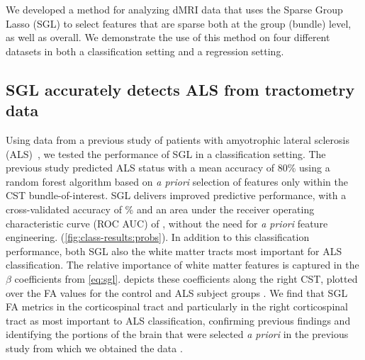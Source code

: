\documentclass[10pt,letterpaper]{article}
\begin{document}
We developed a method for analyzing dMRI  data that uses the Sparse
Group Lasso (SGL) to select features that are sparse both at the group (bundle) level, as well as overall.
We demonstrate the use of this method on four different datasets in
both a classification setting and a regression setting.

\subsection*{SGL accurately detects ALS from tractometry data}

Using data from a previous study of patients with amyotrophic lateral sclerosis (ALS)~\cite{sarica2017corticospinal}, we tested the performance of SGL in a
classification setting. The previous study predicted ALS status with a mean
accuracy of 80\% using a random forest algorithm based on \emph{a priori}
selection of features only within the CST bundle-of-interest.
SGL delivers improved predictive performance, with a cross-validated accuracy
of {\alsAccuracy}\% and an area under the receiver operating characteristic
curve (ROC AUC) of {\alsRocAuc}, without the need for \emph{a priori} feature
engineering.
(\cref{fig:class-results:probs}). In addition to this classification
performance, both SGL  also 
the white matter tracts most important for ALS classification.
The relative importance of white matter
features is captured in the $\beta$ coefficients from \cref{eq:sgl}.
 depicts these coefficients along the
right CST, plotted over the FA values for the control and ALS subject groups .
We find that SGL  FA metrics in the corticospinal tract and
particularly in the right corticospinal tract as most important to ALS
classification, confirming previous findings \cite{van2011upper,
toosy2003diffusion, sarica2014tractography, sage2007quantitative,
sage2009quantitative, karlsborg2004corticospinal, ellis1999diffusion,
cosottini2005diffusion, ciccarelli2009investigation, abe2010voxel} and
identifying the portions of the brain that were selected \emph{a priori} in
the previous study from which we obtained the data
\cite{sarica2017corticospinal}.
\end{document}

